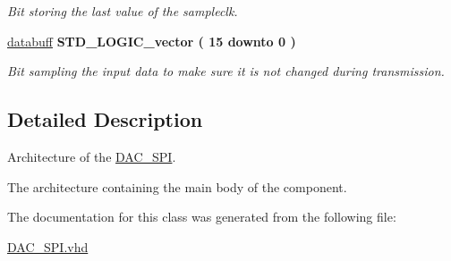 \begin{DoxyCompactItemize}
\begin{DoxyCompactList}\small\item\em Bit storing the last value of the sampleclk. \end{DoxyCompactList}\item 
\hypertarget{classDAC__SPI_1_1SPI_a3ba18b13dd42cfbe57a176e0793f0e15}{\hyperlink{classDAC__SPI_1_1SPI_a3ba18b13dd42cfbe57a176e0793f0e15}{databuff} {\bfseries \textcolor{comment}{S\-T\-D\-\_\-\-L\-O\-G\-I\-C\-\_\-vector}\textcolor{vhdlchar}{ }\textcolor{vhdlchar}{(}\textcolor{vhdlchar}{ }\textcolor{vhdlchar}{ } \textcolor{vhdldigit}{15} \textcolor{vhdlchar}{ }\textcolor{vhdlchar}{ }\textcolor{vhdlchar}{ }\textcolor{vhdlkeyword}{downto}\textcolor{vhdlchar}{ }\textcolor{vhdlchar}{ }\textcolor{vhdlchar}{ } \textcolor{vhdldigit}{0} \textcolor{vhdlchar}{ }\textcolor{vhdlchar}{)}\textcolor{vhdlchar}{ }} }\label{classDAC__SPI_1_1SPI_a3ba18b13dd42cfbe57a176e0793f0e15}

\begin{DoxyCompactList}\small\item\em Bit sampling the input data to make sure it is not changed during transmission. \end{DoxyCompactList}\end{DoxyCompactItemize}


\subsection{Detailed Description}
Architecture of the \hyperlink{classDAC__SPI}{D\-A\-C\-\_\-\-S\-P\-I}. 

The architecture containing the main body of the component. 

The documentation for this class was generated from the following file\-:\begin{DoxyCompactItemize}
\item 
\hyperlink{DAC__SPI_8vhd}{D\-A\-C\-\_\-\-S\-P\-I.\-vhd}\end{DoxyCompactItemize}
